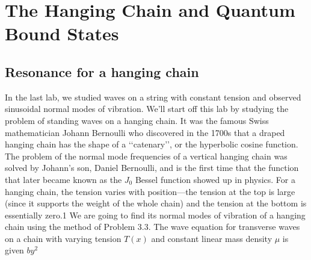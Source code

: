 \documentclass{book}
\theoremstyle{plain}
\theoremstyle{definition}
\numberwithin{exm}{chapter}
\theoremstyle{remark}
\theoremstyle{summary}
\theoremstyle{overview}
\begin{document}
\chapter*{The Hanging Chain and Quantum Bound States}
\section*{Resonance for a hanging chain}

In the last lab, we studied waves on a string with constant tension and observed
sinusoidal normal modes of vibration. We\rq ll start off this lab by studying the
problem of standing waves on a hanging chain. It was the famous Swiss mathematician Johann Bernoulli who discovered in the 1700s that a draped hanging
chain has the shape of a \lq\lq catenary\rq\rq, or the hyperbolic cosine function. The problem of the normal mode frequencies of a vertical hanging chain was solved by
Johann\rq s son, Daniel Bernoulli, and is the first time that the function that later
became known as the $J_0$ Bessel function showed up in physics.
For a hanging chain, the tension varies with position—the tension at the top
is large (since it supports the weight of the whole chain) and the tension at the
bottom is essentially zero.1 We are going to find its normal modes of vibration of a
hanging chain using the method of Problem 3.3. The wave equation for transverse
waves on a chain with varying tension $T (x)$ and constant linear mass density $\mu$ is
given $by^2$
\end{document}

